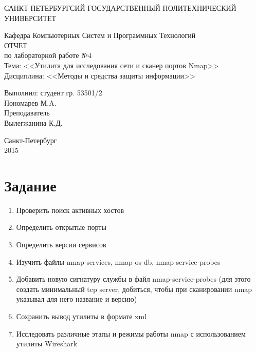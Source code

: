 \documentclass[utf8x, 12pt]{G7-32}
\begin{document}
\frontmatter 


\begin{center} 

\large САНКТ-ПЕТЕРБУРГСИЙ ГОСУДАРСТВЕННЫЙ ПОЛИТЕХНИЧЕСКИЙ УНИВЕРСИТЕТ

\large Кафедра Компьютерных Систем и Программных Технологий \\[5.5cm] 

\huge ОТЧЕТ \\[0.6cm] %
\large по лабораторной работе №4\\
\large Тема: <<Утилита для исследования сети и сканер портов Nmap>>\\
\large Дисциплина: <<Методы и средства защиты информации>>\\[3.7cm]

\end{center} 

\begin{flushright}
Выполнил: студент гр. 53501/2 \\
Пономарев М.A. \\[1.2cm]


Преподаватель \\
Вылегжанина К.Д.
\end{flushright}


\vfill 

\begin{center} 
\large Санкт-Петербург \\
2015
\end{center} 

\thispagestyle{empty}



\thispagestyle{empty}
\setcounter{page}{0}
\tableofcontents
\clearpage
\mainmatter


\chapter{Задание}

\begin{enumerate}
	\item Проверить поиск активных хостов
	\item Определить открытые порты
	\item Определить версии сервисов
	\item Изучить файлы nmap-services, nmap-os-db, nmap-service-probes
	\item Добавить новую сигнатуру службы в файл nmap-service-probes (для этого создать минимальный tcp server, добиться, чтобы при сканировании nmap указывал для него название и версию)
	\item Сохранить вывод утилиты в формате xml
	\item Исследовать различные этапы и режимы работы nmap с использованием утилиты Wireshark
\end{enumerate}
\end{document}
